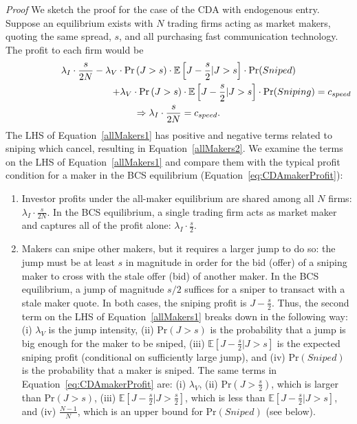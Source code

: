 \documentclass[12pt]{article}
\begin{document}
\begin{appendices}
\noindent \emph{Proof} We sketch the proof for the case of the CDA with endogenous entry. Suppose an equilibrium exists with $N$ trading firms acting as market makers, quoting the same spread, $s$, and all purchasing fast communication technology. The profit to each firm would be
\begin{gather}
\lambda_I\cdot\frac{s}{2N} -\lambda_V\cdot\textrm{Pr}\left(J>s\right)\cdot\mathbb{E}\left[J-\frac{s}{2}|J>s\right]\cdot \textrm{Pr}(Sniped) \nonumber \\
\hspace{1.55in} + \lambda_V\cdot \textrm{Pr}\left(J>s\right)\cdot\mathbb{E}\left[J-\frac{s}{2}|J>s\right]\cdot \textrm{Pr}(Sniping) = c_{speed} \label{allMakers1} \\
\Rightarrow \lambda_I\cdot\frac{s}{2N} = c_{speed}. \label{allMakers2}
\end{gather}
The LHS of Equation~\eqref{allMakers1} has positive and negative terms related to sniping which cancel, resulting in Equation~\eqref{allMakers2}. We examine the terms on the LHS of Equation~\eqref{allMakers1} and compare them with the typical profit condition for a maker in the BCS equilibrium (Equation~\ref{eq:CDAmakerProfit}):
\begin{enumerate}
	\item Investor profits under the all-maker equilibrium are shared among all $N$ firms: $\lambda_I \cdot \frac{s}{2N}$. In the BCS equilibrium, a single trading firm acts as market maker and captures all of the profit alone: $\lambda_I \cdot \frac{s}{2
    }$.
    \item Makers can snipe other makers, but it requires a larger jump to do so: the jump must be at least $s$ in magnitude in order for the bid (offer) of a sniping maker to cross with the stale offer (bid) of another maker. In the BCS equilibrium, a jump of magnitude $s/2$ suffices for a sniper to transact with a stale maker quote. In both cases, the sniping profit is $J-\frac{s}{2}$. Thus, the second term on the LHS of Equation~\eqref{allMakers1} breaks down in the following way: (i) $\lambda_V$ is the jump intensity, (ii) $\text{Pr}(J>s)$ is the probability that a jump is big enough for the maker to be sniped, (iii) $\mathbb{E}\left[J-\frac{s}{2}|J>s\right]$ is the expected sniping profit (conditional on sufficiently large jump), and (iv) $\textrm{Pr}(Sniped)$ is the probability that a maker is sniped. The same terms in Equation~\eqref{eq:CDAmakerProfit} are: (i) $\lambda_V$, (ii) $\text{Pr}\left(J>\frac{s}{2}\right)$, which is larger than $\text{Pr}(J>s)$, (iii) $\mathbb{E}\left[J-\frac{s}{2}|J>\frac{s}{2}\right]$, which is less than $\mathbb{E}\left[J-\frac{s}{2}|J>s\right]$, and (iv) $\frac{N-1}{N}$, which is an upper bound for $\textrm{Pr}(Sniped)$ (see below).
\end{enumerate}


\end{appendices}
\end{document}
